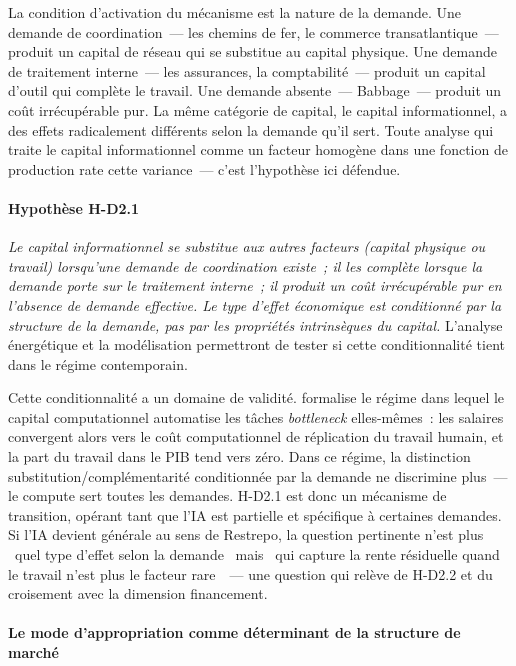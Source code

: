 La condition d'activation du mécanisme est la nature de la demande. Une demande de coordination~--- les chemins de fer, le commerce transatlantique~--- produit un capital de réseau qui se substitue au capital physique. Une demande de traitement interne~--- les assurances, la comptabilité~--- produit un capital d'outil qui complète le travail. Une demande absente~--- Babbage~--- produit un coût irrécupérable pur. La même catégorie de capital, le capital informationnel, a des effets radicalement différents selon la demande qu'il sert. Toute analyse qui traite le capital informationnel comme un facteur homogène dans une fonction de production rate cette variance~--- c'est l'hypothèse ici défendue.

\paragraph{Hypothèse H-D2.1} \emph{Le capital informationnel se substitue aux autres facteurs (capital physique ou travail) lorsqu'une demande de coordination existe~; il les complète lorsque la demande porte sur le traitement interne~; il produit un coût irrécupérable pur en l'absence de demande effective. Le type d'effet économique est conditionné par la structure de la demande, pas par les propriétés intrinsèques du capital.} L'analyse énergétique et la modélisation permettront de tester si cette conditionnalité tient dans le régime contemporain.

Cette conditionnalité a un domaine de validité. \textcite{restrepo_wont_be_missed_2025} formalise le régime dans lequel le capital computationnel automatise les tâches \emph{bottleneck} elles-mêmes~: les salaires convergent alors vers le coût computationnel de réplication du travail humain, et la part du travail dans le PIB tend vers zéro. Dans ce régime, la distinction substitution/complémentarité conditionnée par la demande ne discrimine plus~--- le compute sert toutes les demandes. H-D2.1 est donc un mécanisme de transition, opérant tant que l'IA est partielle et spécifique à certaines demandes. Si l'IA devient générale au sens de Restrepo, la question pertinente n'est plus \og~quel type d'effet selon la demande~\fg{} mais \og~qui capture la rente résiduelle quand le travail n'est plus le facteur rare~\fg{}~--- une question qui relève de H-D2.2 et du croisement avec la dimension financement.


\paragraph{Le mode d'appropriation comme déterminant de la structure de marché}

